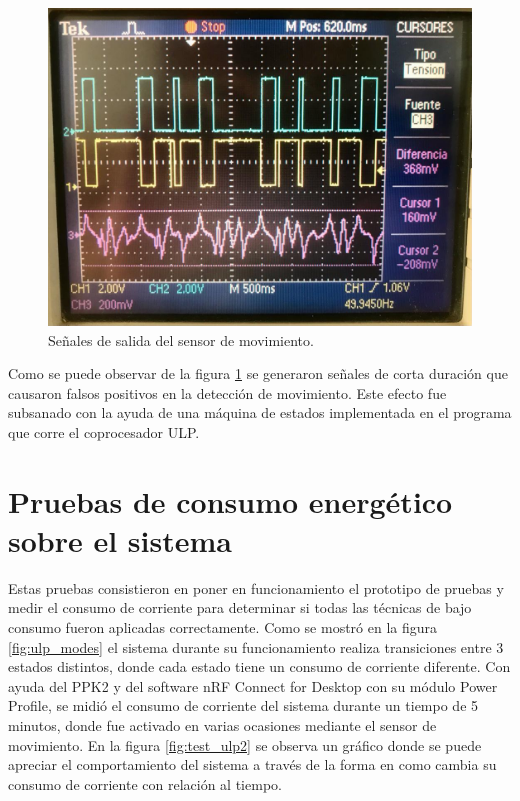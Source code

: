 \begin{figure}[h]
	\centering
	\includegraphics[scale=0.3]{./Figures/test_pir.jpeg}
	\caption{Señales de salida del sensor de movimiento.}
	\label{fig:test_pir}
\end{figure}

Como se puede observar de la figura \ref{fig:test_pir} se generaron señales de corta duración que causaron falsos positivos en la detección de movimiento. Este efecto fue subsanado con la ayuda de una máquina de estados implementada en el programa que corre el coprocesador ULP.

\section{Pruebas de consumo energético sobre el sistema}
Estas pruebas consistieron en poner en funcionamiento el prototipo de pruebas y medir el consumo de corriente para determinar si todas las técnicas de bajo consumo fueron aplicadas correctamente. Como se mostró en la figura \ref{fig:ulp_modes} el sistema durante su funcionamiento realiza transiciones entre 3 estados distintos, donde cada estado tiene un consumo de corriente diferente. Con ayuda del PPK2 y del software nRF Connect for Desktop con su módulo Power Profile, se midió el consumo de corriente del sistema durante un tiempo de 5 minutos, donde fue activado en varias ocasiones mediante el sensor de movimiento. En la figura \ref{fig:test_ulp2} se observa un gráfico donde se puede apreciar el comportamiento del sistema a través de la forma en como cambia su consumo de corriente con relación al tiempo.

